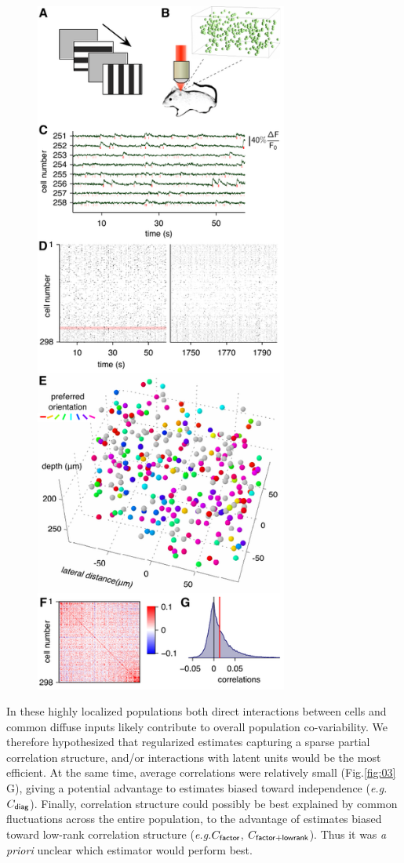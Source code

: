 \documentclass[10pt]{article}
\newcommand{\figref}[2]{Fig.\;\ref{fig:#1}\,#2}
\begin{document}
\begin{figure}
    {\includegraphics[width=8.3cm]{figures/Figure03.pdf}}
\end{figure}

In these highly localized populations both direct interactions between cells and common diffuse inputs likely contribute to overall population co-variability.  We therefore hypothesized that regularized estimates capturing a sparse partial correlation structure, and/or interactions with latent units would be the most efficient. At the same time, average correlations were relatively small (\figref{03}{G}), giving a potential advantage to estimates biased toward independence (\emph{e.g.}\;$C_{\sf diag}$). Finally, correlation structure could possibly be best explained by common fluctuations across the entire population, to the advantage of estimates biased toward low-rank correlation structure (\emph{e.g.}\;$C_{\sf factor}$, $C_{\sf factor+lowrank}$). Thus it was \emph{a priori} unclear which estimator would perform best.
\end{document}
